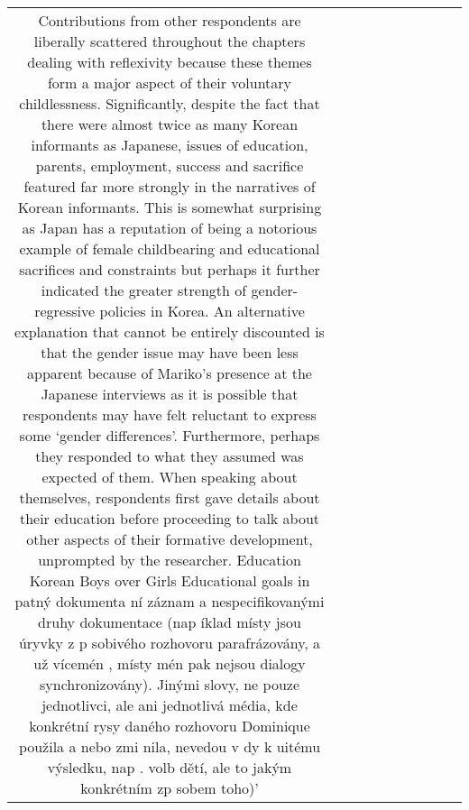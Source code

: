 \begin{table}[h!]
\begin{tabular}{|c|c|c|c|c|c|c|c|c|c|}
Contributions from other respondents are liberally scattered throughout the chapters dealing with reflexivity because these themes form a major aspect of their voluntary childlessness. Significantly, despite the fact that there were almost twice as many Korean informants as Japanese, issues of education, parents, employment, success and sacrifice featured far more strongly in the narratives of Korean informants. This is somewhat surprising as Japan has a reputation of being a notorious example of female childbearing and educational sacrifices and constraints but perhaps it further indicated the greater strength of gender-regressive policies in Korea. An alternative explanation that cannot be entirely discounted is that the gender issue may have been less apparent because of Mariko’s presence at the Japanese interviews as it is possible that respondents may have felt reluctant to express some ‘gender differences’. Furthermore, perhaps they responded to what they assumed was expected of them.
When speaking about themselves, respondents first gave details about their education before proceeding to talk about other aspects of their formative development, unprompted by the researcher.
Education
Korean
Boys over Girls
Educational goals in patný dokumenta ní záznam a nespecifikovanými druhy dokumentace (nap íklad místy jsou úryvky z p sobivého rozhovoru parafrázovány, a už vícemén , místy mén pak nejsou dialogy synchronizovány). Jinými slovy, ne pouze jednotlivci, ale ani jednotlivá média, kde konkrétní rysy daného rozhovoru Dominique použila a nebo zmi nila, nevedou v dy k uitému výsledku, nap . volb dětí, ale to jakým konkrétním zp sobem toho)'
  },


\end{tabular}
\end{table}
